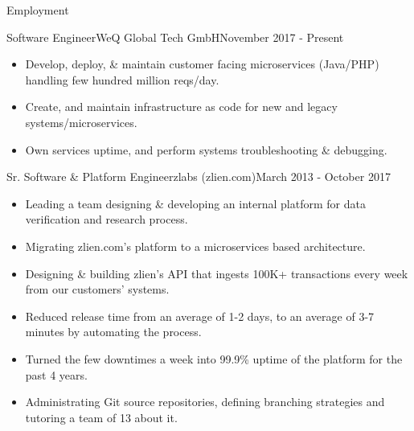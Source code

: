 \documentclass[]{mosabcv}
\begin{document}
    \makeheader

    \begin{cvsection}{Employment}
        \begin{cvsubsection}{Software Engineer}{WeQ Global Tech GmbH}{November 2017 - Present}
            \begin{itemize}
				\item Develop, deploy, \& maintain customer facing microservices (Java/PHP) handling few hundred million reqs/day.
				\item Create, and maintain infrastructure as code for new and legacy systems/microservices.
				\item Own services uptime, and perform systems troubleshooting \& debugging.
            \end {itemize}

        \end{cvsubsection}
			\begin{cvsubsection}{Sr. Software \& Platform Engineer}{zlabs (zlien.com)}{March 2013 - October 2017}
            \begin{itemize}
                \item Leading a team designing \& developing an internal platform for data verification and research process.
                \item Migrating zlien.com's platform to a microservices based architecture.
                \item Designing \& building zlien's API that ingests 100K+ transactions every week from our customers' systems.
                \item Reduced release time from an average of 1-2 days, to an average of 3-7 minutes by automating the process.
                \item Turned the few downtimes a week into 99.9\% uptime of the platform for the past 4 years.
                \item Administrating Git source repositories, defining branching strategies and tutoring a team of 13 about it.
            \end{itemize}
        \end{cvsubsection}


\end{cvsection}
\end{document}
